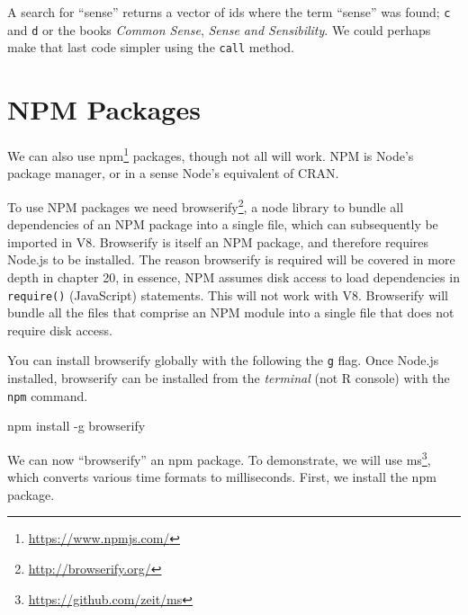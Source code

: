 \documentclass[10pt,]{krantz}
\makeatletter
\newenvironment{Shaded}{\begin{snugshade}}{\end{snugshade}}
\newcommand{\CommentTok}[1]{\textcolor[rgb]{0.37,0.37,0.37}{\textit{#1}}}
\newcommand{\ExtensionTok}[1]{#1}
\newcommand{\KeywordTok}[1]{\textcolor[rgb]{0.27,0.27,0.27}{\textbf{#1}}}
\newcommand{\NormalTok}[1]{#1}
\newcommand{\OperatorTok}[1]{\textcolor[rgb]{0.43,0.43,0.43}{\textbf{#1}}}
\newcommand{\StringTok}[1]{\textcolor[rgb]{0.5,0.5,0.5}{#1}}
\renewcommand{\href}[2]{#2\footnote{\url{#1}}}
\newenvironment{kframe}{%
\medskip{}
\setlength{\fboxsep}{.8em}
 \def\at@end@of@kframe{}%
 \ifinner\ifhmode%
  \def\at@end@of@kframe{\end{minipage}}%
  \begin{minipage}{\columnwidth}%
 \fi\fi%
 \def\FrameCommand##1{\hskip\@totalleftmargin \hskip-\fboxsep
 \colorbox{shadecolor}{##1}\hskip-\fboxsep
     \hskip-\linewidth \hskip-\@totalleftmargin \hskip\columnwidth}%
 \MakeFramed {\advance\hsize-\width
   \@totalleftmargin\z@ \linewidth\hsize
   \@setminipage}}%
 {\par\unskip\endMakeFramed%
 \at@end@of@kframe}
\renewenvironment{Shaded}{\begin{kframe}}{\end{kframe}}
\makeatother
\begin{document}
A search for ``sense'' returns a vector of ids where the term ``sense'' was found; \texttt{c} and \texttt{d} or the books \emph{Common Sense}, \emph{Sense and Sensibility}. We could perhaps make that last code simpler using the \texttt{call} method.

\begin{Shaded}
\end{Shaded}

\hypertarget{v8-npm}{%
\section{NPM Packages}\label{v8-npm}}

We can also use \href{https://www.npmjs.com/}{npm} packages, though not all will work. NPM is Node's package manager, or in a sense Node's equivalent of CRAN.

To use NPM packages we need \href{http://browserify.org/}{browserify}, a node library to bundle all dependencies of an NPM package into a single file, which can subsequently be imported in V8. Browserify is itself an NPM package, and therefore requires Node.js to be installed. The reason browserify is required will be covered in more depth in chapter 20, in essence, NPM assumes disk access to load dependencies in \texttt{require()} (JavaScript) statements. This will not work with V8. Browserify will bundle all the files that comprise an NPM module into a single file that does not require disk access.

You can install browserify globally with the following the \texttt{g} flag. Once Node.js installed, browserify can be installed from the \emph{terminal} (not R console) with the \texttt{npm} command.

\begin{Shaded}
\begin{Highlighting}[]
\ExtensionTok{npm}\NormalTok{ install -g browserify}
\end{Highlighting}
\end{Shaded}

We can now ``browserify'' an npm package. To demonstrate, we will use \href{https://github.com/zeit/ms}{ms}, which converts various time formats to milliseconds. First, we install the npm package.
\end{document}
